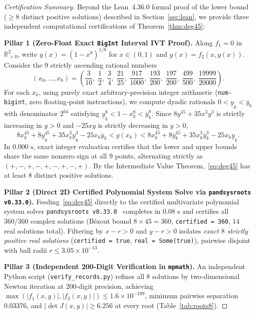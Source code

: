 \documentclass[11pt,a4paper]{amsart}
\theoremstyle{remark}
\newcommand{\R}{\mathbb{R}}
\begin{document}
\begin{proof}[Certification Summary]
Beyond the Lean~4.36.0 formal proof of the lower bound ($\ge 8$ distinct positive solutions) described in Section~\ref{sec:lean}, we provide three independent computational certifications of Theorem~\ref{thm:deg45}:

\smallskip
\noindent\textbf{Pillar 1 (Zero-Float Exact \texttt{BigInt} Interval IVT Proof).}
Along $f_1 = 0$ in $\R_{>0}^2$, write $y(x) = (1 - x^8)^{1/8}$ for $x \in (0, 1)$ and $g(x) = f_2(x, y(x))$. Consider the $9$ strictly ascending rational numbers
\[
  (x_0, \dots, x_8) = \left(\frac{3}{10},\; \frac{1}{2},\; \frac{3}{4},\; \frac{21}{25},\; \frac{917}{1000},\; \frac{193}{200},\; \frac{197}{200},\; \frac{499}{500},\; \frac{19999}{20000}\right).
\]
For each $x_k$, using purely exact arbitrary-precision integer arithmetic (\texttt{num-bigint}, zero floating-point instructions), we compute dyadic rationals $0 < \underline{y}_k < \overline{y}_k$ with denominator $2^{64}$ satisfying $\underline{y}_k^8 < 1 - x_k^8 < \overline{y}_k^8$. Since $8 y^{45} + 35 x^3 y^3$ is strictly increasing in $y > 0$ and $-25 x y$ is strictly decreasing in $y > 0$,
\[
  8 x_k^{45} + 8 \underline{y}_k^{45} + 35 x_k^3 \underline{y}_k^3 - 25 x_k \overline{y}_k
  < g(x_k) <
  8 x_k^{45} + 8 \overline{y}_k^{45} + 35 x_k^3 \overline{y}_k^3 - 25 x_k \underline{y}_k.
\]
In $0.000\text{ s}$, exact integer evaluation certifies that the lower and upper bounds share the same nonzero sign at all $9$ points, alternating strictly as $(+, -, +, -, +, -, +, -, +)$. By the Intermediate Value Theorem,~\eqref{eq:deg45} has at least $8$ distinct positive solutions.

\smallskip
\noindent\textbf{Pillar 2 (Direct 2D Certified Polynomial System Solve via \texttt{pandsysroots v0.33.0}).}
Feeding~\eqref{eq:deg45} directly to the certified multivariate polynomial system solver \texttt{pandsysroots v0.33.0}~\cite{pandsysroots} completes in $0.08\text{ s}$ and certifies all $360/360$ complex solutions (B\'ezout bound $8 \times 45 = 360$, \texttt{certified = 360}, $14$ real solutions total). Filtering by $x - r > 0$ and $y - r > 0$ isolates \emph{exact $8$ strictly positive real solutions} (\texttt{certified = true}, \texttt{real = Some(true)}), pairwise disjoint with ball radii $r \le 3.05 \times 10^{-13}$.

\smallskip
\noindent\textbf{Pillar 3 (Independent 200-Digit Verification in \texttt{mpmath}).}
An independent Python script (\texttt{verify\_records.py}) refines all $8$ solutions by two-dimensional Newton iteration at $200$-digit precision, achieving $\max(|f_1(x, y)|, |f_2(x, y)|) \le 1.6 \times 10^{-199}$, minimum pairwise separation $0.03376$, and $|\det J(x, y)| \ge 6.256$ at every root (Table~\ref{tab:roots8}).
\end{proof}
\end{document}
